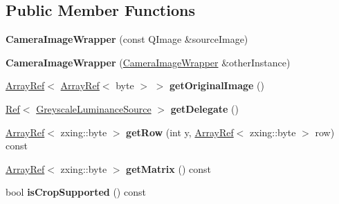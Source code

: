 \subsection*{Public Member Functions}
\begin{DoxyCompactItemize}
\item 
\mbox{\label{class_camera_image_wrapper_a12822216a8a94631df2fd3abd1d69c21}} 
{\bfseries Camera\+Image\+Wrapper} (const Q\+Image \&source\+Image)
\item 
\mbox{\label{class_camera_image_wrapper_ab5764fbee2aa60ff89b3b42067562b8f}} 
{\bfseries Camera\+Image\+Wrapper} (\mbox{\hyperlink{class_camera_image_wrapper}{Camera\+Image\+Wrapper}} \&other\+Instance)
\item 
\mbox{\label{class_camera_image_wrapper_a4f921232740ecb9422600aefbc06b83c}} 
\mbox{\hyperlink{classzxing_1_1_array_ref}{Array\+Ref}}$<$ \mbox{\hyperlink{classzxing_1_1_array_ref}{Array\+Ref}}$<$ byte $>$ $>$ {\bfseries get\+Original\+Image} ()
\item 
\mbox{\label{class_camera_image_wrapper_af7eba619044c6e97e1440a8b37dece54}} 
\mbox{\hyperlink{classzxing_1_1_ref}{Ref}}$<$ \mbox{\hyperlink{classzxing_1_1_greyscale_luminance_source}{Greyscale\+Luminance\+Source}} $>$ {\bfseries get\+Delegate} ()
\item 
\mbox{\label{class_camera_image_wrapper_a662645b5df0c82603408a0d0da06508c}} 
\mbox{\hyperlink{classzxing_1_1_array_ref}{Array\+Ref}}$<$ zxing\+::byte $>$ {\bfseries get\+Row} (int y, \mbox{\hyperlink{classzxing_1_1_array_ref}{Array\+Ref}}$<$ zxing\+::byte $>$ row) const
\item 
\mbox{\label{class_camera_image_wrapper_adad26959c00fdc55d91a0b0e799deb10}} 
\mbox{\hyperlink{classzxing_1_1_array_ref}{Array\+Ref}}$<$ zxing\+::byte $>$ {\bfseries get\+Matrix} () const
\item 
\mbox{\label{class_camera_image_wrapper_a9b070d262f2afc951a2dfdd38c6ff99d}} 
bool {\bfseries is\+Crop\+Supported} () const
\item 
\mbox{\label{class_camera_image_wrapper_a8b4c172013cb930649a2760a45a36e85}} 

\end{DoxyCompactItemize}
